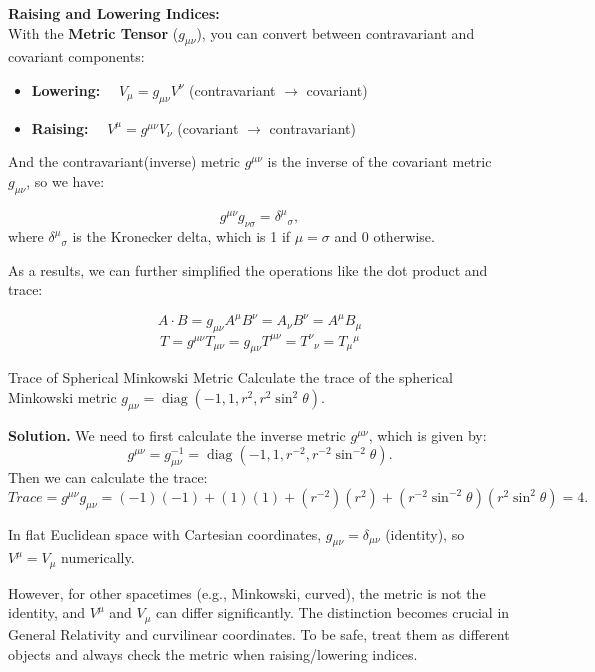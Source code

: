 \begin{theory}
  \bigskip\noindent
  \noindent\textbf{Raising and Lowering Indices:} \\
  \smallskip\noindent
  With the \textbf{Metric Tensor} ($g_{\mu\nu}$), you can convert between contravariant and covariant components:
  \medskip
  \begin{itemize}
    \item \textbf{Lowering:} $\quad V_\mu = g_{\mu\nu} V^\nu$ \quad (contravariant $\to$ covariant)
    \item \textbf{Raising:} $\quad V^\mu = g^{\mu\nu} V_\nu$ \quad (covariant $\to$ contravariant)
  \end{itemize}
\end{theory}

\newpage
And the contravariant(inverse) metric $g^{\mu\nu}$ is the inverse of the covariant metric $g_{\mu\nu}$, so we have:
\begin{theory}
  \[
    g^{\mu\nu} g_{\nu\sigma} = \delta^\mu{}_\sigma,
  \]
  where $\delta^\mu{}_\sigma$ is the Kronecker delta, which is 1 if $\mu = \sigma$ and 0 otherwise.
\end{theory}

\bigskip
As a results, we can further simplified the operations like the dot product and trace:
\begin{theory}
  \[
    A \cdot B = g_{\mu\nu} A^\mu B^\nu = A_\nu B^\nu = A^\mu B_\mu
  \]
  \[
    T = g^{\mu\nu} T_{\mu\nu} = g_{\mu\nu} T^{\mu\nu} = T^\nu{}_\nu = T_\mu{}^\mu
  \]
\end{theory}  

\bigskip\noindent
\begin{example}{Trace of Spherical Minkowski Metric}{}
  Calculate the trace of the spherical Minkowski metric $g_{\mu\nu} = \operatorname{diag}(-1, 1, r^2, r^2 \sin^2\theta)$.

  \bigskip\textbf{Solution.}\quad
  We need to first calculate the inverse metric $g^{\mu\nu}$, which is given by:
  \[
    g^{\mu\nu} = g_{\mu\nu}^{-1} = \operatorname{diag}(-1, 1, r^{-2}, r^{-2} \sin^{-2}\theta).
  \]
  Then we can calculate the trace:
  \[
    Trace = g^{\mu\nu} g_{\mu\nu} = (-1)(-1) + (1)(1) + (r^{-2})(r^2) + (r^{-2} \sin^{-2}\theta)(r^2 \sin^2\theta) = 4.
  \]
\end{example}

\bigskip\noindent
\begin{importantnote}
  In flat Euclidean space with Cartesian coordinates, $g_{\mu\nu} = \delta_{\mu\nu}$ (identity), so $V^\mu = V_\mu$ numerically. 

  \bigskip\noindent
  However, for other spacetimes (e.g., Minkowski, curved), the metric is not the identity, and $V^\mu$ and $V_\mu$ can differ significantly. The distinction becomes crucial in General Relativity and curvilinear coordinates. To be safe, treat them as different objects and always check the metric when raising/lowering indices.
\end{importantnote}

